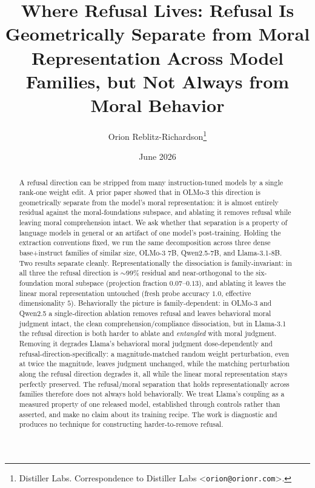 \documentclass{article}
\title{Where Refusal Lives: Refusal Is Geometrically Separate from Moral
Representation Across Model Families, but Not Always from Moral Behavior}
\author{%
  Orion Reblitz-Richardson\thanks{%
    Distiller Labs. Correspondence to Distiller Labs
    \textless\texttt{orion@orionr.com}\textgreater.}
}
\date{June 2026}
\begin{document}
\maketitle

\begin{abstract}
A refusal direction can be stripped from many instruction-tuned models by a
single rank-one weight edit. A prior paper showed that in OLMo-3 this direction
is geometrically separate from the model's moral representation: it is almost
entirely residual against the moral-foundations subspace, and ablating it removes
refusal while leaving moral comprehension intact. We ask whether that separation
is a property of language models in general or an artifact of one model's
post-training. Holding the extraction conventions fixed, we run the same
decomposition across three dense base+instruct families of similar size, OLMo-3
7B, Qwen2.5-7B, and Llama-3.1-8B. Two results separate cleanly. Representationally
the dissociation is family-invariant: in all three the refusal direction is
${\sim}99\%$ residual and near-orthogonal to the six-foundation moral subspace
(projection fraction $0.07$--$0.13$), and ablating it leaves the linear moral
representation untouched (fresh probe accuracy $1.0$, effective dimensionality
$5$). Behaviorally the picture is family-dependent: in OLMo-3 and Qwen2.5 a
single-direction ablation removes refusal and leaves behavioral moral judgment
intact, the clean comprehension/compliance dissociation, but in Llama-3.1 the
refusal direction is both harder to ablate and \emph{entangled} with moral
judgment. Removing it degrades Llama's behavioral moral judgment dose-dependently
and refusal-direction-specifically: a magnitude-matched random weight
perturbation, even at twice the magnitude, leaves judgment unchanged, while the
matching perturbation along the refusal direction degrades it, all while the
linear moral representation stays perfectly preserved. The refusal/moral
separation that holds representationally across families therefore does not
always hold behaviorally. We treat Llama's coupling as a measured property of one
released model, established through controls rather than asserted, and make no
claim about its training recipe. The work is diagnostic and produces no technique
for constructing harder-to-remove refusal.
\end{abstract}







\end{document}
